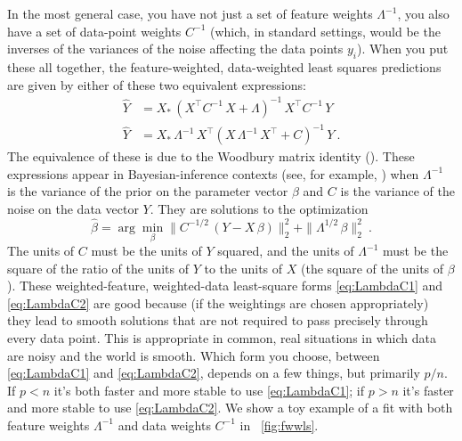 \documentclass[12pt,letterpaper]{article}
\begin{document}
In the most general case, you have not just a set of feature weights $\Lambda^{-1}$, you also have a set of data-point weights $C^{-1}$ (which, in standard settings, would be the inverses of the variances of the noise affecting the data points $y_i$).
When you put these all together, the feature-weighted, data-weighted least squares predictions are given by either of these two equivalent expressions:
\begin{align}\label{eq:LambdaC1}
    \hat{Y} &= X_\ast\,(X^\top C^{-1}\,X + \Lambda)^{-1}\,X^\top C^{-1}\,Y
    \\ \label{eq:LambdaC2}
    \hat{Y} &= X_\ast\,\Lambda^{-1}\,X^\top (X\,\Lambda^{-1}\,X^\top + C)^{-1}\,Y
    ~.
\end{align}
The equivalence of these is due to the Woodbury matrix identity (\citealt{henderson1981deriving}). These expressions appear in Bayesian-inference contexts (see, for example, \citealt{products}) when $\Lambda^{-1}$ is the variance of the prior on the parameter vector $\beta$ and $C$ is the variance of the noise on the data vector $Y$.
They are solutions to the optimization
\begin{equation}
    \hat{\beta} = \arg\min_\beta \|C^{-1/2}\,(Y - X\,\beta)\|_2^2 + \|\Lambda^{1/2}\,\beta\|_2^2
    ~.
\end{equation}
The units of $C$ must be the units of $Y$ squared, and the units of $\Lambda^{-1}$ must be the square of the ratio of the units of $Y$ to the units of $X$ (the square of the units of $\beta$). These weighted-feature, weighted-data least-square forms \eqref{eq:LambdaC1} and \eqref{eq:LambdaC2} are good because (if the weightings are chosen appropriately) they lead to smooth solutions that are not required to pass precisely through every data point. This is appropriate in common, real situations in which data are noisy and the world is smooth. Which form you choose, between \eqref{eq:LambdaC1} and \eqref{eq:LambdaC2}, depends on a few things, but primarily $p/n$. If $p<n$ it's both faster and more stable to use \eqref{eq:LambdaC1}; if $p>n$ it's faster and more stable to use \eqref{eq:LambdaC2}. We show a toy example of a fit with both feature weights $\Lambda^{-1}$ and data weights $C^{-1}$ in \figurename~\ref{fig:fwwls}.
\end{document}
